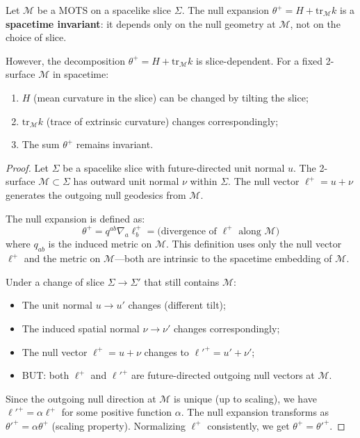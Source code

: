 \begin{theorem}
\label{thm:slice-independence}
Let $\mathcal{M}$ be a MOTS on a spacelike slice $\Sigma$. The null expansion $\theta^+ = H + \mathrm{tr}_{\mathcal{M}} k$ is a \textbf{spacetime invariant}: it depends only on the null geometry at $\mathcal{M}$, not on the choice of slice.

However, the decomposition $\theta^+ = H + \mathrm{tr}_{\mathcal{M}} k$ is slice-dependent. For a fixed 2-surface $\mathcal{M}$ in spacetime:
\begin{enumerate}
\item $H$ (mean curvature in the slice) can be changed by tilting the slice;
\item $\mathrm{tr}_{\mathcal{M}} k$ (trace of extrinsic curvature) changes correspondingly;
\item The sum $\theta^+$ remains invariant.
\end{enumerate}
\end{theorem}

\begin{proof}
Let $\Sigma$ be a spacelike slice with future-directed unit normal $u$. The 2-surface $\mathcal{M} \subset \Sigma$ has outward unit normal $\nu$ within $\Sigma$. The null vector $\ell^+ = u + \nu$ generates the outgoing null geodesics from $\mathcal{M}$.

The null expansion is defined as:
\begin{equation}
\theta^+ = q^{ab} \nabla_a \ell^+_b = \text{(divergence of } \ell^+ \text{ along } \mathcal{M})
\end{equation}
where $q_{ab}$ is the induced metric on $\mathcal{M}$. This definition uses only the null vector $\ell^+$ and the metric on $\mathcal{M}$---both are intrinsic to the spacetime embedding of $\mathcal{M}$.

Under a change of slice $\Sigma \to \Sigma'$ that still contains $\mathcal{M}$:
\begin{itemize}
\item The unit normal $u \to u'$ changes (different tilt);
\item The induced spatial normal $\nu \to \nu'$ changes correspondingly;
\item The null vector $\ell^+ = u + \nu$ changes to $\ell'^+ = u' + \nu'$;
\item BUT: both $\ell^+$ and $\ell'^+$ are future-directed outgoing null vectors at $\mathcal{M}$.
\end{itemize}

Since the outgoing null direction at $\mathcal{M}$ is unique (up to scaling), we have $\ell'^+ = \alpha \ell^+$ for some positive function $\alpha$. The null expansion transforms as $\theta'^+ = \alpha \theta^+$ (scaling property). Normalizing $\ell^+$ consistently, we get $\theta^+ = \theta'^+$.
\end{proof}

